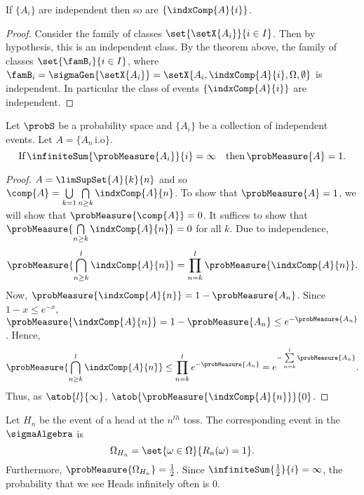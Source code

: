 \begin{Corollary}
    If $\lbrace A_i\rbrace$ are independent then so are $\lbrace \indxComp{A}{i} \rbrace$.
\end{Corollary}
\begin{proof}
    Consider the family of classes $\set{\setX{A_i}}{i\in I}$. Then by hypothesis, this is an independent
    class. By the theorem above, the family of classes $\set{\famB_i}{i\in I}$, where
    $\famB_i = \sigmaGen{\setX{A_i}}  = \setX{A_i,\indxComp{A}{i},\Omega,\emptyset}$ is independent. In
    particular the class of events $\lbrace \indxComp{A}{i} \rbrace$ are independent.
\end{proof}
\begin{Theorem}[name=Second Borel-Cantelli Lemma]\label{thm:borel_cantelli_2}
    Let $\probS$ be a probability space and $\lbrace A_i \rbrace$ be a collection of independent events. Let
    $A =\lbrace A_n \,\text{i.o}\rbrace$. 
    \[\text{If}\,\infiniteSum{\probMeasure{A_i}}{i} = \infty\quad \text{then}\,\probMeasure{A} = 1.\]
\end{Theorem}
\begin{proof}
    $A = \limSupSet{A}{k}{n}$ and so $\comp{A} = \bigcup\limits_{k=1}\bigcap\limits_{n\geq k}\indxComp{A}{n}$.
    To show that $\probMeasure{A} = 1$, we will show that 
    $\probMeasure{\comp{A}} = 0$. It suffices to show that 
    $\probMeasure{\bigcap\limits_{n\geq k}\indxComp{A}{n}} = 0$ for all $k$. Due to independence,
    \[\probMeasure{\bigcap\limits_{n\geq k}^{l}\indxComp{A}{n}} =
	\prod\limits_{n=k}^{l}\probMeasure{\indxComp{A}{n}}.\]
    Now, $\probMeasure{\indxComp{A}{n}} = 1 - \probMeasure{A_n}$. Since $1-x\leq e^{-x}$,
    $\probMeasure{\indxComp{A}{n}} = 1 - \probMeasure{A_n} \leq e^{-\probMeasure{A_n}}$. Hence,
    \[\probMeasure{\bigcap\limits_{n\geq k}^{l}\indxComp{A}{n}} \leq
	\prod\limits_{n=k}^{l}e^{-\probMeasure{A_n}} = e^{-\sum\limits_{n=k}^{l}\probMeasure{A_n}}.\]
    Thus, as $\atob{l}{\infty}$, $\atob{\probMeasure{\indxComp{A}{n}}}{0}$.
\end{proof}
\begin{Example}\label{ex:borel_cantelli_2_ex1}
    Let $H_n$ be the event of a head at the $n^{th}$ toss. The corresponding event in the $\sigmaAlgebra$
    is\[\Omega_{H_n} = \set{\omega\in\Omega}{R_n(\omega) = 1}.\]
    Furthermore, $\probMeasure{\Omega_{H_n}} = \frac{1}{2}$. Since $\infiniteSum{\frac{1}{2}}{i} = \infty$,
    the probability that we see Heads infinitely often is $0$.
\end{Example}
